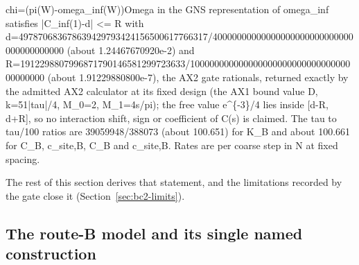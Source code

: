 \begin{gatequote}
chi=(pi(W)-omega\_inf(W))Omega in the GNS representation of omega\_inf
satisfies |C\_inf(1)-d| <= R\textquotesingle{} with
d=4978\allowbreak{}706836\allowbreak{}786394\allowbreak{}297934\allowbreak{}241565\allowbreak{}006177\allowbreak{}66317/\allowbreak{}400000\allowbreak{}000000\allowbreak{}000000\allowbreak{}000000\allowbreak{}000000\allowbreak{}000000\allowbreak{}00000
(about 1.24467670920e-2) and
R\textquotesingle{}=1912298807996871790146581299723633/10000000000000000000000000000000000000000
(about 1.91229880800e-7), the AX2 gate rationals, returned exactly by the
admitted AX2 calculator at its fixed design (the AX1 bound value
D\textquotesingle{}, k\textquotesingle{}=51|tau|/4, M\_0=2, M\_1=4s/pi); the
free value e\textasciicircum{}\{-3\}/4 lies inside [d-R\textquotesingle{},
d+R\textquotesingle{}], so no interaction shift, sign or coefficient of C(s)
is claimed. The tau to tau/100 ratios are 39059948/388073 (about 100.651) for
K\_B and about 100.661 for C\_B, c\_site,B, C\textquotesingle{}\_B and
c\textquotesingle{}\_site,B. Rates are per coarse step in N at fixed spacing.
\end{gatequote}
The rest of this section derives that statement, and the limitations recorded
by the gate close it (Section~\ref{sec:bc2-limits}).

\subsection{The route-B model and its single named construction}
\label{sec:bc2-model}
